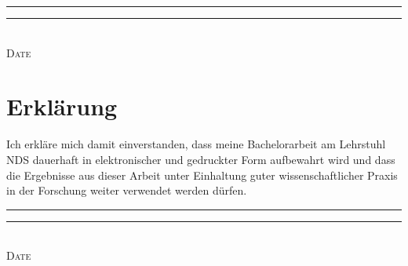 \vspace{2cm}
\rule{4cm}{0.1pt} \hfill \rule{7cm}{0.1pt} \\
\hspace*{1.5cm} \textsc{Date} \hspace*{7cm} \textsc{\@author}

\cleardoublepage

\section*{Erklärung}
{
Ich erkläre mich damit einverstanden, dass meine Bachelorarbeit am 
Lehrstuhl NDS dauerhaft in elektronischer und gedruckter Form aufbewahrt 
wird und dass die Ergebnisse aus dieser Arbeit unter Einhaltung guter 
wissenschaftlicher Praxis in der Forschung weiter verwendet werden dürfen.\@}

\vspace{2cm}
\rule{4cm}{0.1pt} \hfill \rule{7cm}{0.1pt} \\
\hspace*{1.5cm} \textsc{Date} \hspace*{7cm} \textsc{\@author}

\cleardoublepage

\pagestyle{scrheadings} %

\tableofcontents

\cleardoublepage
